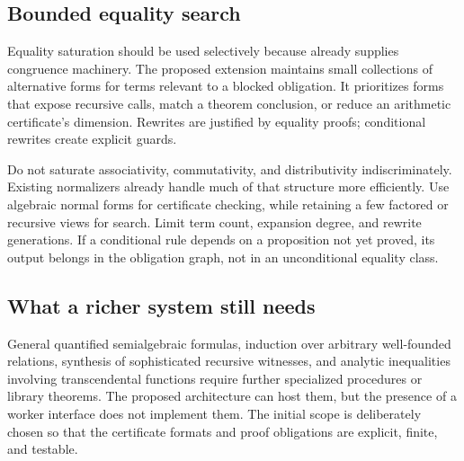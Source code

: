 \subsection{Bounded equality search}

Equality saturation should be used selectively because \grind{} already supplies congruence machinery. The proposed extension maintains small collections of alternative forms for terms relevant to a blocked obligation. It prioritizes forms that expose recursive calls, match a theorem conclusion, or reduce an arithmetic certificate's dimension. Rewrites are justified by equality proofs; conditional rewrites create explicit guards.

Do not saturate associativity, commutativity, and distributivity indiscriminately. Existing normalizers already handle much of that structure more efficiently. Use algebraic normal forms for certificate checking, while retaining a few factored or recursive views for search. Limit term count, expansion degree, and rewrite generations. If a conditional rule depends on a proposition not yet proved, its output belongs in the obligation graph, not in an unconditional equality class.

\subsection{What a richer system still needs}

General quantified semialgebraic formulas, induction over arbitrary well-founded relations, synthesis of sophisticated recursive witnesses, and analytic inequalities involving transcendental functions require further specialized procedures or library theorems. The proposed architecture can host them, but the presence of a worker interface does not implement them. The initial scope is deliberately chosen so that the certificate formats and proof obligations are explicit, finite, and testable.
